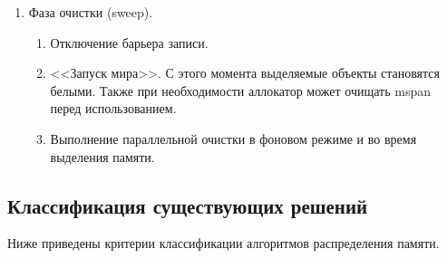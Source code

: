 \begin{enumerate}[label*=\arabic*.]
	\item Фаза очистки (sweep).
	\begin{enumerate}[label*=\arabic*.]
		\item Отключение барьера записи.
		\item <<Запуск мира>>. С этого момента выделяемые объекты становятся белыми. Также при необходимости аллокатор может очищать mspan перед использованием.
		\item Выполнение параллельной очистки в фоновом режиме и во время выделения памяти.
	\end{enumerate}
\end{enumerate}

\subsection{Классификация существующих решений}

Ниже приведены критерии классификации алгоритмов распределения памяти.

